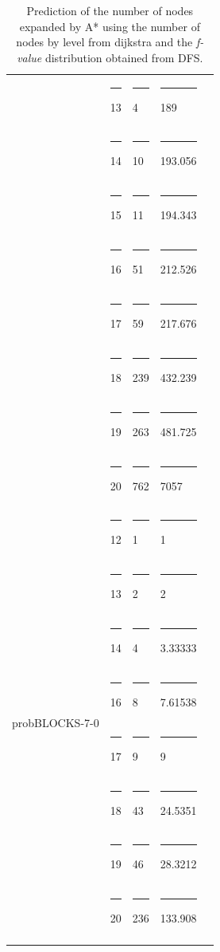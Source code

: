 \documentclass[11pt,a4paper,oneside]{report}
\begin{document}
\begin{longtable}{@{\extracolsep{\fill}} lllll @{}}
                                &\rule{4pt}{0ex} 13        &\rule{4pt}{0ex} 4               &\rule{4pt}{0ex} 189          \\ \cline{2-4} 
                                &\rule{4pt}{0ex} 14        &\rule{4pt}{0ex} 10              &\rule{4pt}{0ex} 193.056      \\ \cline{2-4} 
                                &\rule{4pt}{0ex} 15        &\rule{4pt}{0ex} 11              &\rule{4pt}{0ex} 194.343      \\ \cline{2-4} 
                                &\rule{4pt}{0ex} 16        &\rule{4pt}{0ex} 51              &\rule{4pt}{0ex} 212.526      \\ \cline{2-4} 
                                &\rule{4pt}{0ex} 17        &\rule{4pt}{0ex} 59              &\rule{4pt}{0ex} 217.676      \\ \cline{2-4} 
                                &\rule{4pt}{0ex} 18        &\rule{4pt}{0ex} 239             &\rule{4pt}{0ex} 432.239      \\ \cline{2-4} 
                                &\rule{4pt}{0ex} 19        &\rule{4pt}{0ex} 263             &\rule{4pt}{0ex} 481.725      \\ \cline{2-4} 
                                &\rule{4pt}{0ex} 20        &\rule{4pt}{0ex} 762             &\rule{4pt}{0ex} 7057         \\ \hline                                
\multirow{8}{*}{probBLOCKS-7-0} &\rule{4pt}{0ex} 12        &\rule{4pt}{0ex} 1                &\rule{4pt}{0ex} 1           \\ \cline{2-4}
                                &\rule{4pt}{0ex} 13        &\rule{4pt}{0ex} 2                &\rule{4pt}{0ex} 2           \\ \cline{2-4}
                                &\rule{4pt}{0ex} 14        &\rule{4pt}{0ex} 4                &\rule{4pt}{0ex} 3.33333     \\ \cline{2-4}
                                &\rule{4pt}{0ex} 16        &\rule{4pt}{0ex} 8                &\rule{4pt}{0ex} 7.61538     \\ \cline{2-4}
                                &\rule{4pt}{0ex} 17        &\rule{4pt}{0ex} 9                &\rule{4pt}{0ex} 9           \\ \cline{2-4} 
                                &\rule{4pt}{0ex} 18        &\rule{4pt}{0ex} 43               &\rule{4pt}{0ex} 24.5351     \\ \cline{2-4} 
                                &\rule{4pt}{0ex} 19        &\rule{4pt}{0ex} 46               &\rule{4pt}{0ex} 28.3212     \\ \cline{2-4} 
                                &\rule{4pt}{0ex} 20        &\rule{4pt}{0ex} 236              &\rule{4pt}{0ex} 133.908     \\ \hline                              
\caption{Prediction of the number of nodes expanded by A* using the number of nodes by level from dijkstra and the \textit{f-value} distribution obtained from DFS.}
\label{table:predictionDFS}
\end{longtable}
\end{document}
